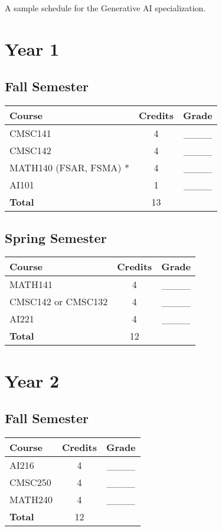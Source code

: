 
A sample schedule for the Generative AI specialization.

\section*{Year 1}
\subsection*{Fall Semester}
\begin{tabular}{|l|c|c|}
    \hline
    Course & Credits & Grade \\
    \hline
    CMSC141 & 4 & \_\_\_\_ \\
    CMSC142 & 4 & \_\_\_\_ \\
    MATH140 (FSAR, FSMA) * & 4 & \_\_\_\_ \\
    AI101 & 1 & \_\_\_\_ \\
    \hline
    \textbf{Total} & 13 & \\
    \hline
\end{tabular}

\subsection*{Spring Semester}
\begin{tabular}{|l|c|c|}
    \hline
    Course & Credits & Grade \\
    \hline
    MATH141 & 4 & \_\_\_\_ \\
    CMSC142 or CMSC132 & 4 & \_\_\_\_ \\
    AI221 & 4 & \_\_\_\_ \\
    \hline
    \textbf{Total} & 12 & \\
    \hline
\end{tabular}

\section*{Year 2}
\subsection*{Fall Semester}
\begin{tabular}{|l|c|c|}
    \hline
    Course & Credits & Grade \\
    \hline
    AI216 & 4 & \_\_\_\_ \\
    CMSC250 & 4 & \_\_\_\_ \\
    MATH240 & 4 & \_\_\_\_ \\
    \hline
    \textbf{Total} & 12 & \\
    \hline
\end{tabular}

